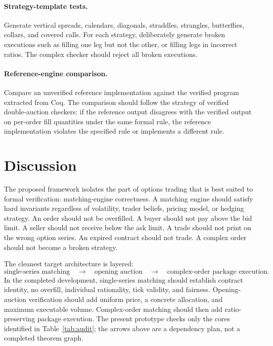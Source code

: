 \documentclass[11pt]{article}
\begin{document}
\paragraph{Strategy-template tests.}
Generate vertical spreads, calendars, diagonals, straddles, strangles, butterflies, collars, and covered calls. For each strategy, deliberately generate broken executions such as filling one leg but not the other, or filling legs in incorrect ratios. The complex checker should reject all broken executions.

\paragraph{Reference-engine comparison.}
Compare an unverified reference implementation against the verified program extracted from Coq. The comparison should follow the strategy of verified double-auction checkers: if the reference output disagrees with the verified output on per-order fill quantities under the same formal rule, the reference implementation violates the specified rule or implements a different rule.

\section{Discussion}

The proposed framework isolates the part of options trading that is best suited to formal verification: matching-engine correctness. A matching engine should satisfy hard invariants regardless of volatility, trader beliefs, pricing model, or hedging strategy. An order should not be overfilled. A buyer should not pay above the bid limit. A seller should not receive below the ask limit. A trade should not print on the wrong option series. An expired contract should not trade. A complex order should not become a broken strategy.

The cleanest target architecture is layered:
\[
\text{single-series matching}
\quad\longrightarrow\quad
\text{opening auction}
\quad\longrightarrow\quad
\text{complex-order package execution}.
\]
In the completed development, single-series matching should establish contract identity, no overfill, individual rationality, tick validity, and fairness. Opening-auction verification should add uniform price, a concrete allocation, and maximum executable volume. Complex-order matching should then add ratio-preserving package execution. The present prototype checks only the cores identified in Table~\ref{tab:audit}; the arrows above are a dependency plan, not a completed theorem graph.
\end{document}

